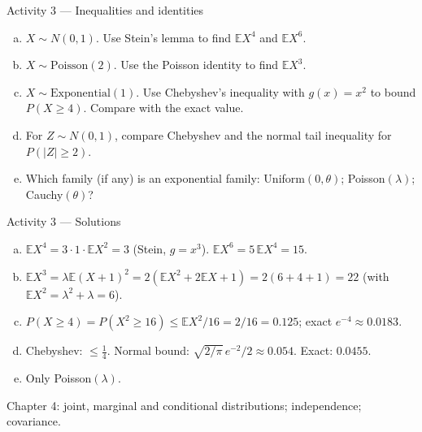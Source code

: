 \documentclass[aspectratio=169,t,10pt]{beamer}
\newcommand{\E}{\mathbb{E}}
\begin{document}
\begin{frame}[t]{Activity 3 --- Inequalities and identities}
  \begin{tcolorbox}[myquiz={Problems}]\small
  \begin{enumerate}[(a)]
    \item $X\sim N(0,1)$. Use Stein's lemma to find $\E X^4$ and $\E X^6$.
    \item $X\sim\mathrm{Poisson}(2)$. Use the Poisson identity to find $\E X^3$.
    \item $X\sim\mathrm{Exponential}(1)$. Use Chebyshev's inequality with $g(x)=x^2$ to bound $P(X\ge4)$. Compare with the exact value.
    \item For $Z\sim N(0,1)$, compare Chebyshev and the normal tail inequality for $P(|Z|\ge2)$.
    \item Which family (if any) is an exponential family: Uniform$(0,\theta)$; Poisson$(\lambda)$; Cauchy$(\theta)$?
  \end{enumerate}
  \end{tcolorbox}
\end{frame}

\begin{frame}[t]{Activity 3 --- Solutions}
  \small
  \begin{enumerate}[(a)]
    \item $\E X^4=3\cdot1\cdot\E X^2=3$ (Stein, $g=x^3$). $\E X^6=5\,\E X^4=15$.
    \item $\E X^3=\lambda\E(X+1)^2=2(\E X^2+2\E X+1)=2(6+4+1)=22$ (with $\E X^2=\lambda^2+\lambda=6$).
    \item $P(X\ge4)=P(X^2\ge16)\le\E X^2/16=2/16=0.125$; exact $e^{-4}\approx0.0183$.
    \item Chebyshev: $\le\frac14$. Normal bound: $\sqrt{2/\pi}\,e^{-2}/2\approx0.054$. Exact: $0.0455$.
    \item Only Poisson$(\lambda)$.
  \end{enumerate}
  \bigskip
  \begin{tcolorbox}[mynote={Next}]\small Chapter 4: joint, marginal and conditional distributions; independence; covariance.\end{tcolorbox}
\end{frame}
\end{document}
